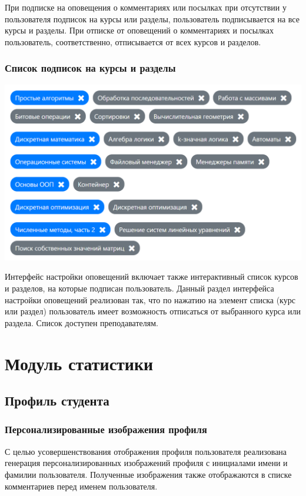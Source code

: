 \documentclass[12pt, a4paper, oneside]{article}
\begin{document}
При подписке на оповещения о комментариях или посылках при отсутствии у пользователя подписок на курсы или разделы, пользователь подписывается на все курсы и разделы. При отписке от оповещений о комментариях и посылках пользователь, соответственно, отписывается от всех курсов и разделов.
\subsubsection{Список подписок на курсы и разделы}
\begin{center}
    \includegraphics[scale=0.45]{courses-contests-subscriptions}
\end{center}

Интерфейс настройки оповещений включает также интерактивный список курсов и разделов, на которые подписан пользователь. Данный раздел интерфейса настройки оповещений реализован так, что по нажатию на элемент списка (курс или раздел) пользователь имеет возможность отписаться от выбранного курса или раздела. Список доступен преподавателям.
\newpage

\section{Модуль статистики}
\subsection{Профиль студента}
\subsubsection{Персонализированные изображения профиля}
С целью усовершенствования отображения профиля пользователя реализована генерация персонализированных изображений профиля с инициалами имени и фамилии пользователя. Полученные изображения также отображаются в списке комментариев перед именем пользователя.
\end{document}
